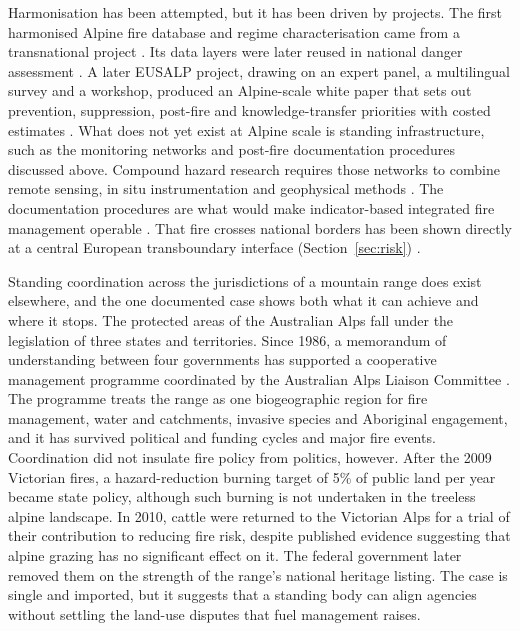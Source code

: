 \documentclass[11pt,a4paper]{article}
\begin{document}
Harmonisation has been attempted, but it has been driven by projects. The first harmonised Alpine fire database and regime characterisation came from a transnational project \citep{valese_wildfires_2011}. Its data layers were later reused in national danger assessment \citep{muller_towards_2020}. A later EUSALP project, drawing on an expert panel, a multilingual survey and a workshop, produced an Alpine-scale white paper that sets out prevention, suppression, post-fire and knowledge-transfer priorities with costed estimates \citep{muller_forest_2020}. What does not yet exist at Alpine scale is standing infrastructure, such as the monitoring networks and post-fire documentation procedures discussed above. Compound hazard research requires those networks to combine remote sensing, in situ instrumentation and geophysical methods \citep{baselt_compound_2026}. The documentation procedures are what would make indicator-based integrated fire management operable \citep{melzner_wildfire-induced_2025}. That fire crosses national borders has been shown directly at a central European transboundary interface (Section~\ref{sec:risk}) \citep{avouris_exposure_2025}.

Standing coordination across the jurisdictions of a mountain range does exist elsewhere, and the one documented case shows both what it can achieve and where it stops. The protected areas of the Australian Alps fall under the legislation of three states and territories. Since 1986, a memorandum of understanding between four governments has supported a cooperative management programme coordinated by the Australian Alps Liaison Committee \citep{lockwood_biodiversity_2014}. The programme treats the range as one biogeographic region for fire management, water and catchments, invasive species and Aboriginal engagement, and it has survived political and funding cycles and major fire events. Coordination did not insulate fire policy from politics, however. After the 2009 Victorian fires, a hazard-reduction burning target of 5\% of public land per year became state policy, although such burning is not undertaken in the treeless alpine landscape. In 2010, cattle were returned to the Victorian Alps for a trial of their contribution to reducing fire risk, despite published evidence suggesting that alpine grazing has no significant effect on it. The federal government later removed them on the strength of the range's national heritage listing. The case is single and imported, but it suggests that a standing body can align agencies without settling the land-use disputes that fuel management raises.
\end{document}
